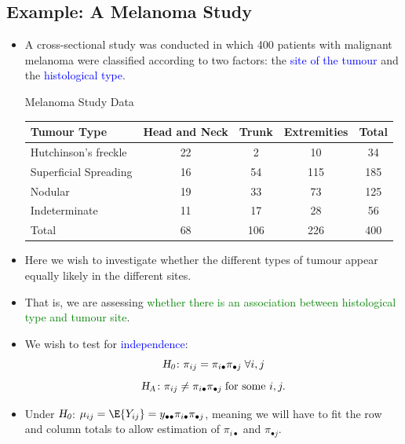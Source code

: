 \documentclass{article}\usepackage[]{graphicx}\usepackage[svgnames]{xcolor}
\newcommand{\HN}{\textsl{H}_{\textsl{0}}}%
\newcommand{\HA}{\textsl{H}_{\textsl{A}}}%
\begin{document}
\subsection*{Example: A Melanoma Study}
\begin{itemize}
    \item A cross-sectional study was conducted in which 400 patients with malignant
          melanoma were classified according to two factors: the \textcolor{Blue}{site of the tumour} and the
          \textcolor{Blue}{histological type}.
          \begin{Example}{Melanoma Study Data}
              \begin{center}
                  \begin{tabular}{lcccc}
                      Tumour Type           & Head and Neck & Trunk & Extremities & Total \\
                      \midrule
                      Hutchinson's freckle  & 22            & 2     & 10          & 34    \\
                      Superficial Spreading & 16            & 54    & 115         & 185   \\
                      Nodular               & 19            & 33    & 73          & 125   \\
                      Indeterminate         & 11            & 17    & 28          & 56    \\
                      Total                 & 68            & 106   & 226         & 400
                  \end{tabular}
              \end{center}
          \end{Example}
    \item Here we wish to investigate whether the different types of tumour appear equally
          likely in the different sites.
    \item That is, we are assessing \textcolor{Green}{whether there is an association between
              histological type and tumour site}.
    \item We wish to test for \textcolor{Blue}{independence}:
          \[ \HN\colon \pi_{ij}=\pi_{i\bullet}\pi_{\bullet j}\;\forall i,j \]
          \[ \HA\colon \pi_{ij}\ne \pi_{i\bullet}\pi_{\bullet j}\;\text{for some } i,j. \]
    \item Under $ \HN $: $ \mu_{ij}=\E{Y_{ij}}=y_{\bullet\bullet}\pi_{i\bullet}\pi_{\bullet j} $, meaning we will have to fit the row and
          column totals to allow estimation of $ \pi_{i\bullet} $ and $ \pi_{\bullet j} $.

\end{itemize}
\end{document}

